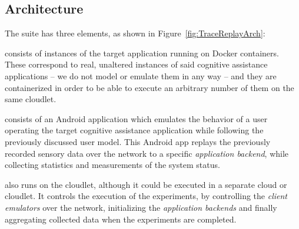 
\subsection{Architecture}

The suite has three elements, as shown in Figure~\ref{fig:TraceReplayArch}:

\begin{description}[labelindent=\parindent, listparindent=\parindent, style=unboxed, leftmargin=0cm]
  \item [The application backend] consists of instances of the target application running on Docker containers. 
  These correspond to real, unaltered instances of said cognitive assistance applications -- we do not model or emulate them in any way -- and they are containerized in order to be able to execute an arbitrary number of them on the same cloudlet.
  \item [The client emulator] consists of an Android application which emulates the behavior of a user operating the target cognitive assistance application while following the previously discussed user model.
  This Android app replays the previously recorded sensory data over the network to a specific \emph{application backend}, while collecting statistics and measurements of the system status. 
  \item [The control backend] also runs on the cloudlet, although it could be executed in a separate cloud or cloudlet. It controls the execution of the experiments, by controlling the \emph{client emulators} over the network, initializing the \emph{application backends} and finally aggregating collected data when the experiments are completed. 
\end{description}

